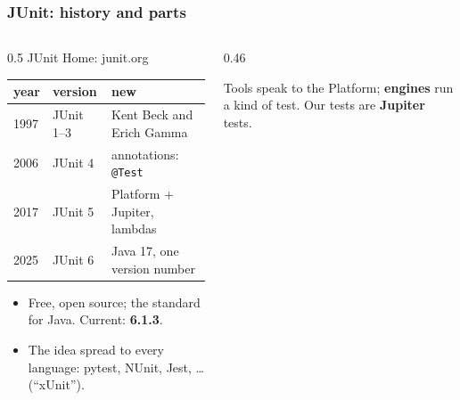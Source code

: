 \documentclass[aspectratio=169,10pt,compress]{beamer}
\begin{document}




\begin{frame}[t,fragile] \frametitle{JUnit: history and parts}
  \begin{columns}[T]
    \begin{column}{0.5\textwidth}
    	JUnit Home: junit.org~\cite{homeJunit}
      \begin{center}\small
      \begin{tabular}{lll}
        \toprule
        \textbf{year} & \textbf{version} & \textbf{new} \\
        \midrule
        1997          & JUnit 1--3       & Kent Beck and Erich Gamma \\
        2006          & JUnit 4          & annotations: \texttt{@Test} \\
        2017          & JUnit 5          & Platform + Jupiter, lambdas \\
        2025          & JUnit 6          & Java 17, one version number \\
        \bottomrule
      \end{tabular}
      \end{center}
      \vspace{0.3em}
      \begin{itemize}\small
        \item Free, open source; the standard for Java. Current: \textbf{6.1.3}.
        \item The idea spread to every language: pytest, NUnit, Jest, \dots{} (``xUnit'').
      \end{itemize}
    \end{column}
    \begin{column}{0.46\textwidth}
      \begin{center}
      \end{center}
      \small Tools speak to the Platform; \textbf{engines} run a kind of test. Our tests are \textbf{Jupiter} tests.
    \end{column}
  \end{columns}
\end{frame}
\end{document}
